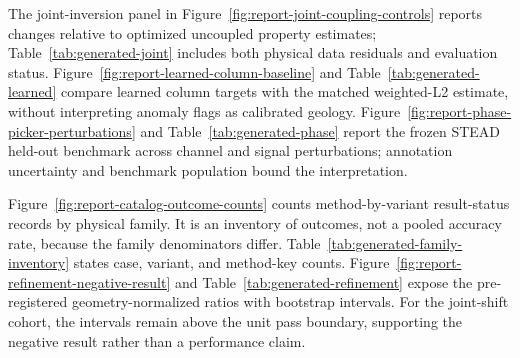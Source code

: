 The joint-inversion panel in Figure~\ref{fig:report-joint-coupling-controls}
reports changes relative to optimized uncoupled property estimates;
Table~\ref{tab:generated-joint} includes both physical data residuals
and evaluation status. Figure~\ref{fig:report-learned-column-baseline}
and Table~\ref{tab:generated-learned} compare learned column targets
with the matched weighted-L2 estimate, without interpreting anomaly flags
as calibrated geology. Figure~\ref{fig:report-phase-picker-perturbations}
and Table~\ref{tab:generated-phase} report the frozen STEAD held-out
benchmark across channel and signal perturbations; annotation
uncertainty and benchmark population bound the interpretation.

Figure~\ref{fig:report-catalog-outcome-counts} counts method-by-variant
result-status records by physical family. It is an inventory of outcomes, not
a pooled accuracy rate, because the family denominators differ.
Table~\ref{tab:generated-family-inventory} states case, variant, and
method-key counts. Figure~\ref{fig:report-refinement-negative-result}
and Table~\ref{tab:generated-refinement} expose the pre-registered
geometry-normalized ratios with bootstrap intervals. For the joint-shift
cohort, the intervals remain above the unit pass boundary, supporting the
negative result rather than a performance claim.



